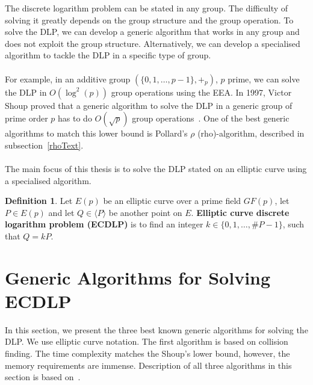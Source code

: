 \documentclass[thesis=M,english]{FITthesis}[2012/10/20]
\theoremstyle{remark}
\theoremstyle{definition}
\newtheorem{DF}{Definition}[section]
\begin{document}
\noindent The discrete logarithm problem can be stated in any group. The difficulty of solving it greatly depends on the group structure and the group operation. To solve the DLP, we can develop a generic algorithm that works in any group and does not exploit the group structure. Alternatively, we can develop a specialised algorithm to tackle the DLP in a specific type of group. \\\\
\noindent For example, in an additive group $(\{0,1,\ldots, p-1\}, +_p)$, $p$ prime, we can solve the DLP in $O(\log^2(p))$ group operations using the EEA. In 1997, Victor Shoup proved that a generic algorithm to solve the DLP in a generic group of prime order $p$ has to do $O(\sqrt{p})$ group operations~\cite{shoup}. One of the best generic algorithms to match this lower bound is Pollard's $\rho$ (rho)-algorithm, described in subsection~\ref{rhoText}. 
\\
\\
\noindent The main focus of this thesis is to solve the DLP stated on an elliptic curve using a specialised algorithm. 
\begin{DF}
Let $E(p)$ be an elliptic curve over a prime field $GF(p)$, let $P \in E(p)$ and let $Q \in \langle P \rangle$ be another point on $E$. \textbf{Elliptic curve discrete logarithm problem (ECDLP)} is to find an integer $k \in \{0,1,\ldots, \#P - 1\}$, such that $Q = kP$.
\end{DF}
\section{Generic Algorithms for Solving ECDLP}
In this section, we present the three best known generic algorithms for solving the DLP. We use elliptic curve notation. The first algorithm is based on collision finding. The time complexity matches the Shoup's lower bound, however, the memory requirements are immense. Description of all three algorithms in this section is based on~\cite{mky}.
\end{document}
